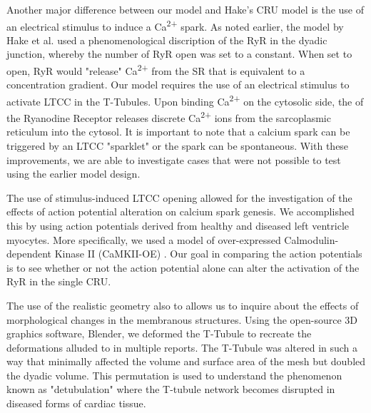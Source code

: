 \documentclass[12pt]{ucsddissertation}
\begin{document}
Another major difference between our model and Hake's CRU model is the use of an electrical stimulus to induce a Ca\textsuperscript{2+} spark. As noted earlier, the model by Hake et al. used a phenomenological discription of the RyR in the dyadic junction, whereby the number of RyR open was set to a constant. When set to open, RyR would "release" Ca\textsuperscript{2+} from the SR that is equivalent to a concentration gradient. Our model requires the use of an electrical stimulus to activate LTCC in the T-Tubules. Upon binding Ca\textsuperscript{2+} on the cytosolic side, the of the Ryanodine Receptor releases discrete Ca\textsuperscript{2+} ions from the sarcoplasmic reticulum into the cytosol. It is important to note that a calcium spark can be triggered by an LTCC "sparklet" or the spark can be spontaneous. With these improvements, we are able to investigate cases that were not possible to test using the earlier model design.

The use of stimulus-induced LTCC opening allowed for the investigation of the effects of action potential alteration on calcium spark genesis. We accomplished this by using action potentials derived from healthy and diseased left ventricle myocytes. More specifically, we used a model of over-expressed Calmodulin-dependent Kinase II (CaMKII-OE) \cite{Morotti2014}. Our goal in comparing the action potentials is to see whether or not the action potential alone can alter the activation of the RyR in the single CRU. 
 
The use of the realistic geometry also to allows us to inquire about the effects of morphological changes in the membranous structures. Using the open-source 3D graphics software, Blender, we deformed the T-Tubule to recreate the deformations alluded to in multiple reports\cite{Sobie2013AlterationsAnalyses, Polakova2013,Crossman2015,}. The T-Tubule was altered in such a way that minimally affected the volume and surface area of the mesh but doubled the dyadic volume. This permutation is used to understand the phenomenon known as "detubulation" where the T-tubule network becomes disrupted in diseased forms of cardiac tissue.  

\end{document}
